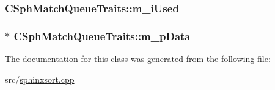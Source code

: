 \hypertarget{classCSphMatchQueueTraits_a79d40a751ae08d2693fbf52c8444b4c2}{
\subsubsection[{m\-\_\-i\-Used}]{ C\-Sph\-Match\-Queue\-Traits\-::m\-\_\-i\-Used\hspace{0.3cm}{\ttfamily [protected]}}}\label{classCSphMatchQueueTraits_a79d40a751ae08d2693fbf52c8444b4c2}
\hypertarget{classCSphMatchQueueTraits_a2fe4eba7fda1aebb934e4651c08b4f65}{
\subsubsection[{m\-\_\-p\-Data}]{$\ast$ C\-Sph\-Match\-Queue\-Traits\-::m\-\_\-p\-Data\hspace{0.3cm}{\ttfamily [protected]}}}\label{classCSphMatchQueueTraits_a2fe4eba7fda1aebb934e4651c08b4f65}


The documentation for this class was generated from the following file\-:\begin{DoxyCompactItemize}
\item 
src/\hyperlink{sphinxsort_8cpp}{sphinxsort.\-cpp}\end{DoxyCompactItemize}

